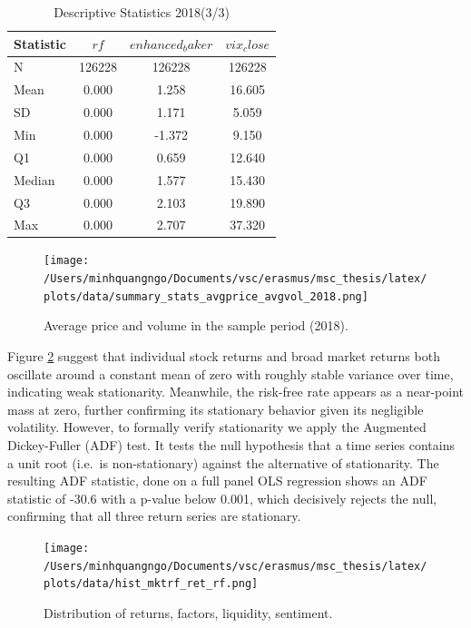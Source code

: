     \begin{table}[ht]
    \centering
    \caption{Descriptive Statistics 2018(3/3)}
    \label{tab:descr_stats_2018_3}
    \begin{tabular}{lccc}
    \toprule
    Statistic & $rf$ & $enhanced_baker$ & $vix_close$ \\\midrule
    N & 126228 & 126228 & 126228 \\
    Mean & 0.000 & 1.258 & 16.605 \\
    SD & 0.000 & 1.171 & 5.059 \\
    Min & 0.000 & -1.372 & 9.150 \\
    Q1 & 0.000 & 0.659 & 12.640 \\
    Median & 0.000 & 1.577 & 15.430 \\
    Q3 & 0.000 & 2.103 & 19.890 \\
    Max & 0.000 & 2.707 & 37.320 \\
    \bottomrule
    \end{tabular}
    \end{table}
 
    \begin{figure}[H]
        \centering
        \texttt{[image: /Users/minhquangngo/Documents/vsc/erasmus/msc\_thesis/latex/plots/data/summary\_stats\_avgprice\_avgvol\_2018.png]}
        \caption{Average price and volume in the sample period (2018).}
        \label{fig:avgprice_avgvol_2018}
    \end{figure}

 Figure \ref{fig:his_mktrf_ret_rf} suggest that individual stock returns and broad market returns both oscillate around a constant mean of zero with roughly stable variance over time, indicating weak stationarity. Meanwhile, the risk-free rate appears as a near-point mass at zero, further confirming its stationary behavior given its negligible volatility. However, to formally verify stationarity we apply the Augmented Dickey-Fuller (ADF) test. It tests the null hypothesis that a time series contains a unit root (i.e.\ is non-stationary) against the alternative of stationarity. The resulting ADF statistic, done on a full panel OLS regression shows an ADF statistic of -30.6 with a p-value below 0.001, which decisively rejects the null, confirming that all three return series are stationary.


\begin{figure}[H]
     \centering
     \texttt{[image: /Users/minhquangngo/Documents/vsc/erasmus/msc\_thesis/latex/plots/data/hist\_mktrf\_ret\_rf.png]}
     \caption{Distribution of returns, factors, liquidity, sentiment.}
     \label{fig:his_mktrf_ret_rf}
 \end{figure}

